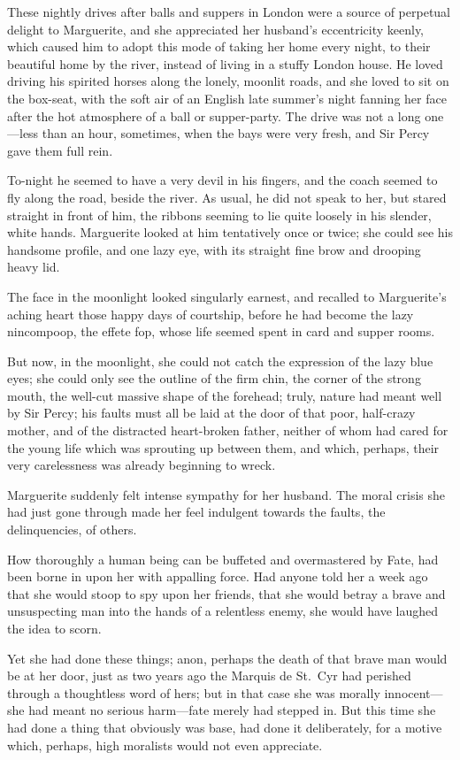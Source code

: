 \documentclass[paper=a5,BCOR=7mm,twoside,DIV=calc,12pt,usegeometry,chapterprefix,endperiod,headings=big]{scrbook}
\begin{document}
These nightly drives after balls and suppers in London were a source of perpetual delight to Marguerite, and she appreciated her husband's eccentricity keenly, which caused him to adopt this mode of taking her home every night, to their beautiful home by the river, instead of living in a stuffy London house. He loved driving his spirited horses along the lonely, moonlit roads, and she loved to sit on the box-seat, with the soft air of an English late summer's night fanning her face after the hot atmosphere of a ball or supper-party. The drive was not a long one---less than an hour, sometimes, when the bays were very fresh, and Sir Percy gave them full rein.

To-night he seemed to have a very devil in his fingers, and the coach seemed to fly along the road, beside the river. As usual, he did not speak to her, but stared straight in front of him, the ribbons seeming to lie quite loosely in his slender, white hands. Marguerite looked at him tentatively once or twice; she could see his handsome profile, and one lazy eye, with its straight fine brow and drooping heavy lid.

The face in the moonlight looked singularly earnest, and recalled to Marguerite's aching heart those happy days of courtship, before he had become the lazy nincompoop, the effete fop, whose life seemed spent in card and supper rooms.

But now, in the moonlight, she could not catch the expression of the lazy blue eyes; she could only see the outline of the firm chin, the corner of the strong mouth, the well-cut massive shape of the forehead; truly, nature had meant well by Sir Percy; his faults must all be laid at the door of that poor, half-crazy mother, and of the distracted heart-broken father, neither of whom had cared for the young life which was sprouting up between them, and which, perhaps, their very carelessness was already beginning to wreck.

Marguerite suddenly felt intense sympathy for her husband. The moral crisis she had just gone through made her feel indulgent towards the faults, the delinquencies, of others.

How thoroughly a human being can be buffeted and overmastered by Fate, had been borne in upon her with appalling force. Had anyone told her a week ago that she would stoop to spy upon her friends, that she would betray a brave and unsuspecting man into the hands of a relentless enemy, she would have laughed the idea to scorn.

Yet she had done these things; anon, perhaps the death of that brave man would be at her door, just as two years ago the Marquis de St.~Cyr had perished through a thoughtless word of hers; but in that case she was morally innocent---she had meant no serious harm---fate merely had stepped in. But this time she had done a thing that obviously was base, had done it deliberately, for a motive which, perhaps, high moralists would not even appreciate.
\end{document}
